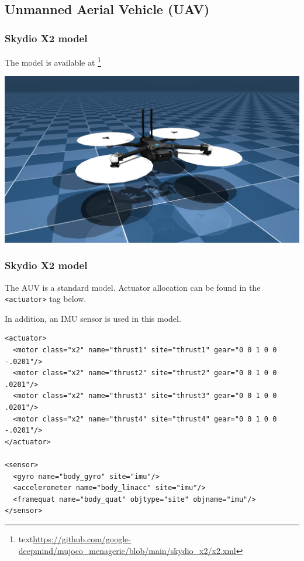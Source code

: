 \documentclass[9pt]{beamer}
\begin{document}
		\subsection{Unmanned Aerial Vehicle (UAV)}
			\begin{frame}[fragile]
				\frametitle{Skydio X2 model}
				The model is available at \footnote{text\href{https://github.com/google-deepmind/mujoco_menagerie/blob/main/skydio_x2/x2.xml}{https://github.com/google-deepmind/mujoco\_menagerie/blob/main/skydio\_x2/x2.xml}}
				\begin{center}
					\includegraphics[width=1\linewidth]{images/mjc-x2}
				\end{center}
				
			\end{frame}
		
			\begin{frame}[fragile]
				\frametitle{Skydio X2 model}
				The AUV is a standard model. Actuator allocation can be found in the \texttt{<actuator>} tag below.
				
				In addition, an IMU sensor is used in this model.
					\begin{verbatim}
<actuator>
  <motor class="x2" name="thrust1" site="thrust1" gear="0 0 1 0 0 -.0201"/>
  <motor class="x2" name="thrust2" site="thrust2" gear="0 0 1 0 0  .0201"/>
  <motor class="x2" name="thrust3" site="thrust3" gear="0 0 1 0 0  .0201"/>
  <motor class="x2" name="thrust4" site="thrust4" gear="0 0 1 0 0 -.0201"/>
</actuator>

<sensor>
  <gyro name="body_gyro" site="imu"/>
  <accelerometer name="body_linacc" site="imu"/>
  <framequat name="body_quat" objtype="site" objname="imu"/>
</sensor>
				\end{verbatim}
			\end{frame}
		
\end{document}
